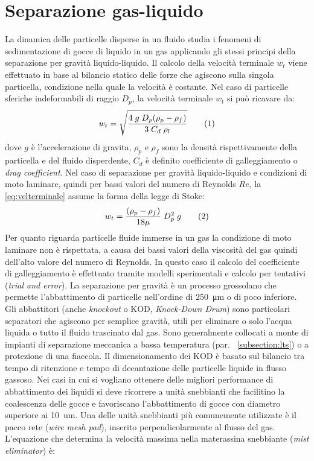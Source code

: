 \section{Separazione gas-liquido}
La dinamica delle particelle disperse in un fluido studia i fenomeni di sedimentazione di gocce di liquido in un gas applicando gli stessi principi della separazione per gravità liquido-liquido. Il calcolo della velocità terminale \(w_t\) viene effettuato in base al bilancio statico delle forze che agiscono sulla singola particella, condizione nella quale la velocità è costante. Nel caso di particelle sferiche indeformabili di raggio \(D_p\), la velocità terminale \(w_t\) si può ricavare da:
\[w_t=\sqrt{\dfrac{4 \; g \; D_p(\rho_p-\rho_f)}{3 \; C_d \; \rho_l}} \addtag \label{eq:velterminale}\]
dove \(g\) è l'accelerazione di gravita, \(\rho_p\) e \(\rho_f\) sono la densità rispettivamente della particella e del fluido disperdente, \(C_d\) è definito coefficiente di galleggiamento o \textit{drag coefficient}. Nel caso di separazione per gravità liquido-liquido e condizioni di moto laminare, quindi per bassi valori del numero di Reynolds \(Re\), la \eqref{eq:velterminale} assume la forma della legge di Stoke:
\[w_t= \dfrac{(\rho_p-\rho_f)}{18\mu} \; D_p^2\; g \addtag \label{eq:stoke}\]
Per quanto riguarda particelle fluide immerse in un gas la condizione di moto laminare non è rispettata, a causa dei bassi valori della viscosità del gas quindi dell'alto valore del numero di Reynolds. In questo caso il calcolo del coefficiente di galleggiamento è effettuato tramite modelli sperimentali e calcolo per tentativi (\textit{trial and error}). La separazione per gravità è un processo grossolano che permette l'abbattimento di particelle nell'ordine di \SI{250}{\um} o di poco inferiore. Gli abbattitori (anche \textit{knockout} o KOD, \textit{Knock-Down Drum}) sono particolari separatori che agiscono per semplice gravità, utili per eliminare o solo l'acqua liquida o tutto il fluido trascinato dal gas. Sono generalmente collocati a monte di impianti di separazione meccanica a bassa temperatura (par. ~\ref{subsection:lts}) o a protezione di una fiaccola. Il dimensionamento dei KOD è basato sul bilancio tra tempo di ritenzione e tempo di decantazione delle particelle liquide in flusso gassoso.
Nei casi in cui si vogliano ottenere delle migliori performance di abbattimento dei liquidi si deve ricorrere a unità snebbianti che facilitino la coalescenza delle gocce e favoriscano l'abbattimento di gocce con diametro superiore ai \SI{10}{um}. Una delle unità snebbianti più comunemente utilizzate è il pacco rete (\textit{wire mesh pad}), inserito perpendicolarmente al flusso del gas. L'equazione che determina la velocità massima nella materassina snebbiante (\textit{mist eliminator}) è:
